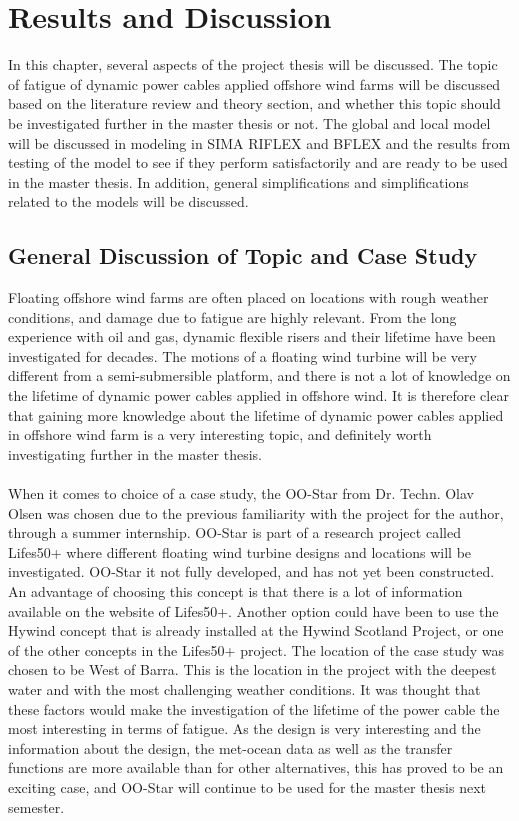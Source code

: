 \chapter{Results and Discussion}
\label{chap:discussion}
 In this chapter, several aspects of the project thesis will be discussed. The topic of fatigue of dynamic power cables applied offshore wind farms will be discussed based on the literature review and theory section, and whether this topic should be investigated further in the master thesis or not. The global and local model will be discussed in modeling in SIMA RIFLEX and BFLEX and the results from testing of the model to see if they perform satisfactorily and are ready to be used in the master thesis. In addition, general simplifications and simplifications related to the models will be discussed. 
 \section{General Discussion of Topic and Case Study}
Floating offshore wind farms are often placed on locations with rough weather conditions, and damage due to fatigue are highly relevant. From the long experience with oil and gas, dynamic flexible risers and their lifetime have been investigated for decades. The motions of a floating wind turbine will be very different from a semi-submersible platform, and there is not a lot of knowledge on the lifetime of dynamic power cables applied in offshore wind. It is therefore clear that gaining more knowledge about the lifetime of dynamic power cables applied in offshore wind farm is a very interesting topic, and definitely worth investigating further in the master thesis. \\\\ When it comes to choice of a case study, the OO-Star from Dr. Techn. Olav Olsen was chosen due to the previous familiarity with the project for the author, through a summer internship. OO-Star is part of a research project called Lifes50+ where different floating wind turbine designs and locations will be investigated. OO-Star it not fully developed, and has not yet been constructed. An advantage of choosing this concept is that there is a lot of information available on the website of Lifes50+. Another option could have been to use the Hywind concept that is already installed at the Hywind Scotland Project, or one of the other concepts in the Lifes50+ project. The location of the case study was chosen to be West of Barra. This is the location in the project with the deepest water and with the most challenging weather conditions. It was thought that these factors would make the investigation of the lifetime of the power cable the most interesting in terms of fatigue. As the design is very interesting and the information about the design, the met-ocean data as well as the transfer functions are more available than for other alternatives, this has proved to be an exciting case, and OO-Star will continue to be used for the master thesis next semester. 
